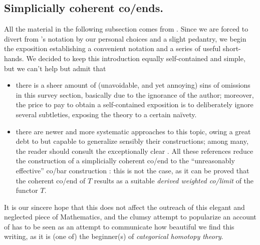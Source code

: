 \subsection{Simplicially coherent co/ends.}
All the material in the following subsection comes from \cite{cordier1997homotopy}. Since we are forced to divert from \cite{cordier1997homotopy}'s notation by our personal choices and a slight pedantry, we begin the exposition establishing a convenient notation and a series of useful short-hands. We decided to keep this introduction equally self-contained and simple, but we can't help but admit that
\begin{itemize}
\item there is a sheer amount of (unavoidable, and yet annoying) sins of omissions in this survey section, basically due to the ignorance of the author; moreover, the price to pay to obtain a self-contained exposition is to deliberately ignore several subtleties, exposing  the theory to a certain na\"ivety.
\item there are newer and more systematic approaches to this topic, owing a great debt to \cite{cordier1997homotopy} but capable to generalize sensibly their constructions; among many, the reader should consult the exceptionally clear \cite{riehl2014categorical,shulman}. All these references reduce the construction of a simplicially coherent co/end to the ``unreasonably effective'' co/bar construction \cite[\achap\textbf{4}]{riehl2014categorical}: this is not the case, as it can be proved \cite[21.4]{shulman} that the coherent co/end of $T$ results as a suitable \emph{derived weighted co/limit} of the functor $T$.
\end{itemize} 
It is our sincere hope that this does not affect the outreach of this elegant and neglected piece of Mathematics, and the clumsy attempt to popularize an account of \cite{cordier1997homotopy} has to be seen as an attempt to communicate how beautiful we find this writing, as it is (one of) the beginner(s) of \emph{categorical homotopy theory}.
